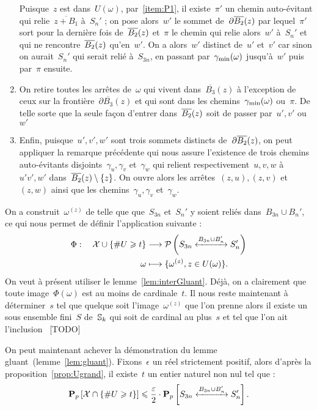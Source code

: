 \begin{dem}
\begin{enumerate}
					Puisque~$z$ est dans~$U(\omega)$, par~\ref{item:P1}, il existe~$\pi'$ un chemin auto-évitant qui relie~$\overline{z+B_1}$ à~$S_n'$ ; on pose alors~$w'$ le sommet de~$\partial\overline{B_{2}}(z)$ par lequel~$\pi'$ sort pour la dernière fois de~$\overline{B_{2}}(z)$ et~$\pi$ le chemin qui relie alors~$w'$ à~$S_n'$ et qui ne rencontre~$\overline{B_{2}}(z)$ qu'en~$w'$. On a alors~$w'$ distinct de~$u'$ et~$v'$ car sinon on aurait~$S_n'$ qui serait relié à~$S_{3n}$, en passant par~$\gamma_{\mathrm{min}}(\omega)$ jusqu'à~$w'$ puis par~$\pi$ ensuite.
					\item On retire toutes les arrêtes de~$\omega$ qui vivent dans~$\overline{B_3}(z)$ à l'exception de ceux sur la frontière~$\partial\overline{B_3}(z)$ et qui sont dans les chemins~$\gamma_{\mathrm{min}}(\omega)$ ou~$\pi$. De telle sorte que la seule façon d'entrer dans~$\overline{B_{2}}(z)$ soit de passer par~$u', v'$ ou~$w'$
					\item Enfin, puisque~$u',v',w'$ sont trois sommets distincts de~$\partial\overline{B_{2}}(z)$, on peut appliquer la remarque précédente qui nous assure l'existence de trois chemins auto-évitants disjoints~$\gamma_u,\gamma_v$ et~$\gamma_w$ qui relient respectivement~$u,v,w$ à~$u'v',w'$ dans~$\overline{B_{2}}(z)\setminus\{z\}$.  On ouvre alors les arrêtes~$(z,u), (z,v)$ et~$(z,w)$ ainsi que les chemins~$\gamma_u,\gamma_v$ et~$\gamma_w$.
				\end{enumerate}
				On a construit~$\omega^{(z)}$ de telle que que~$S_{3n}$ et~$S_n'$ y soient reliés dans~$B_{3n}\cup B_n'$, ce qui nous permet de définir l'application suivante :
				\begin{align*}
					\Phi : \quad \mathcal{X} \cup \{\# U \geq t\} 	& \longrightarrow 
																						\mathcal{P}\left(
																							\relie[B_{3n}\cup B_n']{S_{3n}}{S_n'}		
																						\right)\\
																					\omega	& \longmapsto  \{\omega^{(z)}, z\in U(\omega)\}.
				\end{align*}
				On veut à présent utiliser le lemme~\ref{lem:interGluant}. Déjà, on a clairement que toute image~$\Phi(\omega)$ est au moins de cardinale~$t$. Il nous reste maintenant à déterminer~$s$ tel que quelque soit l'image~$\omega^{(z)}$ que l'on prenne alors il existe un sous ensemble fini~$S$ de~$\mathbb{S}_k$ qui soit de cardinal au plus~$s$ et tel que l'on ait l'inclusion~
				[TODO]
			\end{dem}
			On peut maintenant achever la démonstration du lemme gluant~(lemme~\ref{lem:gluant}). Fixons~$\epsilon$ un réel strictement positif, alors d'après la proposition~\ref{prop:Ugrand}, il existe~$t$ un entier naturel non nul tel que :
			\begin{equation}\label{eq:finalGluant:1}
					\Pp{\mathcal{X}\cap\{\#U \geq t\}} 
				\leq 
					\frac{\epsilon}{2}
					\cdot
					\Pp{\relie[B_{3n}\cup B_n']{S_{3n}}{S_n'}}.			
			\end{equation}
